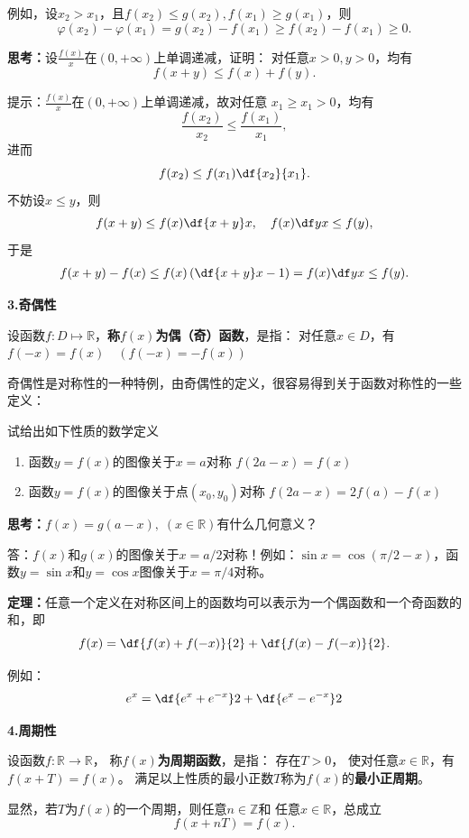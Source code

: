 例如，设$x_2>x_1$，且$f(x_2)\leq g(x_2),f(x_1)\geq g(x_1)$，则
$$\varphi(x_2)-\varphi(x_1)
=g(x_2)-f(x_1)\geq f(x_2)-f(x_1)\geq 0.$$
\fi

\bs
{\bf 思考：}设$\frac{f(x)}x$在$(0,+\infty)$上单调递减，证明：
对任意$x>0,y>0$，均有
$$f(x+y)\leq f(x)+f(y).$$

\ifhint
提示：$\frac{f(x)}x$在$(0,+\infty)$上单调递减，故对任意
$x_1\geq x_1>0$，均有
$$\frac{f(x_2)}{x_2}\leq \frac{f(x_1)}{x_1},$$
进而
$$f(x_2)\leq f(x_1)\df{x_2}{x_1}.$$
不妨设$x\leq y$，则
$$f(x+y)\leq f(x)\df{x+y}x,\quad
f(x)\df yx\leq f(y),$$
于是
\begin{align*}
	f(x+y)-f(x)
	\leq f(x)\left(\df{x+y}x-1\right)
	=f(x)\df yx\leq f(y).
\end{align*}
\fi

\bs

{\bf 3.奇偶性}

设函数$f:D\mapsto\mathbb{R}$，{\bf 称$f(x)$为偶（奇）函数}，是指：
对任意$x\in D$，有$f(-x)=f(x)\quad(f(-x)=-f(x))$

奇偶性是对称性的一种特例，由奇偶性的定义，很容易得到关于函数对称性的一些定义：

\bs
\egz 试给出如下性质的数学定义
\begin{enumerate}[(1)]
  \setlength{\itemindent}{1cm}
  \item 函数$y=f(x)$的图像关于$x=a$对称
  \dotfill$f(2a-x)=f(x)$
  \item 函数$y=f(x)$的图像关于点$(x_0,y_0)$对称
  \dotfill $f(2a-x)=2f(a)-f(x)$
\end{enumerate}

\bs
{\bf 思考：}$f(x)=g(a-x),\;(x\in\mathbb{R})$有什么几何意义？

\ifhint
答：$f(x)$和$g(x)$的图像关于$x=a/2$对称！例如：$\sin x
=\cos(\pi/2-x)$，函数$y=\sin x$和$y=\cos x$图像关于$x=\pi/4$对称。
\fi

\bs
\begin{thx}
	{\bf 定理：}任意一个定义在对称区间上的函数均可以表示为一个偶函数和一个奇函数的和，即
	$$f(x)=\df{f(x)+f(-x)}{2}+\df{f(x)-f(-x)}{2}.$$
\end{thx}
例如：
$$e^x=\df{e^x+e^{-x}}2+\df{e^x-e^{-x}}2$$

\bs
{\bf 4.周期性}

设函数$f:\mathbb{R}\to\mathbb{R}$，
称{\bf $f(x)$为周期函数}，是指： 存在$T>0$，
使对任意$x\in\mathbb{R}$，有
$f(x+T)=f(x)$。
满足以上性质的最小正数$T$称为$f(x)$的{\bf 最小正周期}。
		 
显然，若$T$为$f(x)$的一个周期，则任意$n\in\mathbb{Z}$和
任意$x\in\mathbb{R}$，总成立
$$f(x+nT)=f(x).$$


